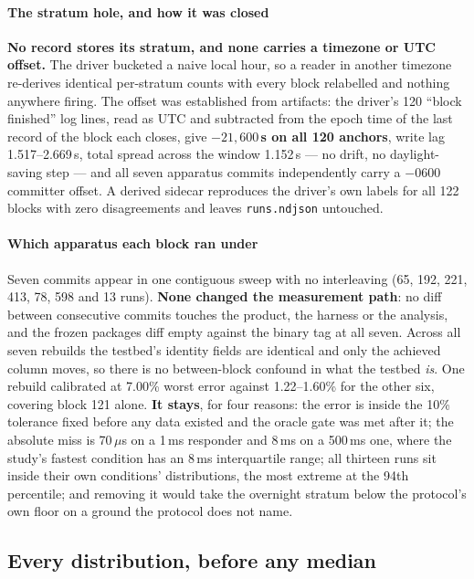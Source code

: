 \documentclass[conference]{IEEEtran}
\begin{document}
\paragraph*{The stratum hole, and how it was closed} \textbf{No record stores
its stratum, and none carries a timezone or UTC offset.} The driver bucketed a
naive local hour, so a reader in another timezone re-derives identical
per-stratum counts with every block relabelled and nothing anywhere firing. The
offset was established from artifacts: the driver's 120 ``block finished'' log
lines, read as UTC and subtracted from the epoch time of the last record of the
block each closes, give \textbf{$-21{,}600$\,s on all 120 anchors}, write lag
1.517--2.669\,s, total spread across the window 1.152\,s --- no drift, no
daylight-saving step --- and all seven apparatus commits independently carry a
$-0600$ committer offset. A derived sidecar reproduces the driver's own labels
for all 122 blocks with zero disagreements and leaves \texttt{runs.ndjson}
untouched.

\paragraph*{Which apparatus each block ran under} Seven commits appear in one
contiguous sweep with no interleaving (65, 192, 221, 413, 78, 598 and 13 runs).
\textbf{None changed the measurement path}: no diff between consecutive commits
touches the product, the harness or the analysis, and the frozen packages diff
empty against the binary tag at all seven. Across all seven rebuilds the
testbed's identity fields are identical and only the achieved column moves, so
there is no between-block confound in what the testbed \emph{is}. One rebuild
calibrated at 7.00\% worst error against 1.22--1.60\% for the other six,
covering block 121 alone. \textbf{It stays}, for four reasons: the error is
inside the 10\% tolerance fixed before any data existed and the oracle gate was
met after it; the absolute miss is 70\,$\mu$s on a 1\,ms responder and 8\,ms on
a 500\,ms one, where the study's fastest condition has an 8\,ms interquartile
range; all thirteen runs sit inside their own conditions' distributions, the
most extreme at the 94th percentile; and removing it would take the overnight
stratum below the protocol's own floor on a ground the protocol does not name.

\subsection{Every distribution, before any median}
\label{sec:shapes}
\end{document}
